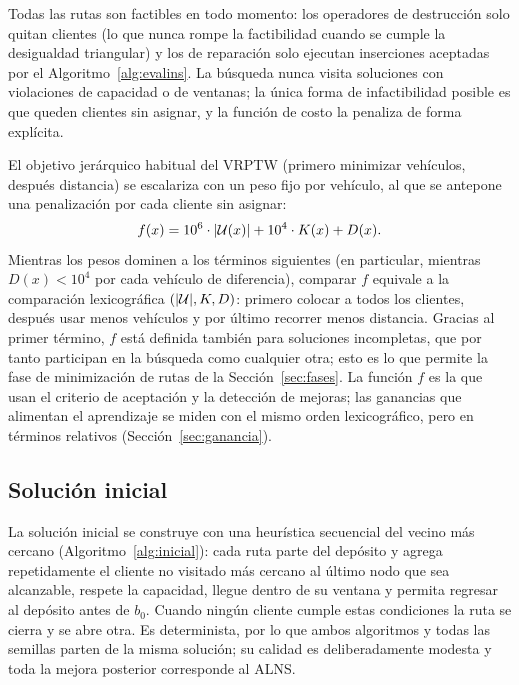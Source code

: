 Todas las rutas son factibles en todo momento: los operadores de destrucción solo quitan
clientes (lo que nunca rompe la factibilidad cuando se cumple la desigualdad triangular) y los
de reparación solo ejecutan inserciones aceptadas por el Algoritmo~\ref{alg:evalins}. La
búsqueda nunca visita soluciones con violaciones de capacidad o de ventanas; la única forma de
infactibilidad posible es que queden clientes sin asignar, y la función de costo la penaliza
de forma explícita.

El objetivo jerárquico habitual del VRPTW (primero minimizar vehículos, después distancia) se
escalariza con un peso fijo por vehículo, al que se antepone una penalización por cada
cliente sin asignar:
\begin{equation}
f(x)=10^{6}\cdot|\mathcal{U}(x)|+10^{4}\cdot K(x)+D(x).
\label{eq:costo}
\end{equation}
Mientras los pesos dominen a los términos siguientes (en particular, mientras $D(x)<10^4$ por
cada vehículo de diferencia), comparar $f$ equivale a la comparación lexicográfica
$(|\mathcal{U}|,K,D)$: primero colocar a todos los clientes, después usar menos vehículos y por
último recorrer menos distancia. Gracias al primer término, $f$ está definida también para
soluciones incompletas, que por tanto participan en la búsqueda como cualquier otra; esto es
lo que permite la fase de minimización de rutas de la Sección~\ref{sec:fases}. La función $f$
es la que usan el criterio de aceptación y la detección de mejoras; las ganancias que
alimentan el aprendizaje se miden con el mismo orden lexicográfico, pero en términos
relativos (Sección~\ref{sec:ganancia}).

\subsection{Solución inicial}

La solución inicial se construye con una heurística secuencial del vecino más cercano
(Algoritmo~\ref{alg:inicial}): cada ruta parte del depósito y agrega repetidamente el cliente
no visitado más cercano al último nodo que sea alcanzable, respete la capacidad, llegue dentro
de su ventana y permita regresar al depósito antes de $b_0$. Cuando ningún cliente cumple
estas condiciones la ruta se cierra y se abre otra. Es determinista, por lo que ambos
algoritmos y todas las semillas parten de la misma solución; su calidad es deliberadamente
modesta y toda la mejora posterior corresponde al ALNS.

